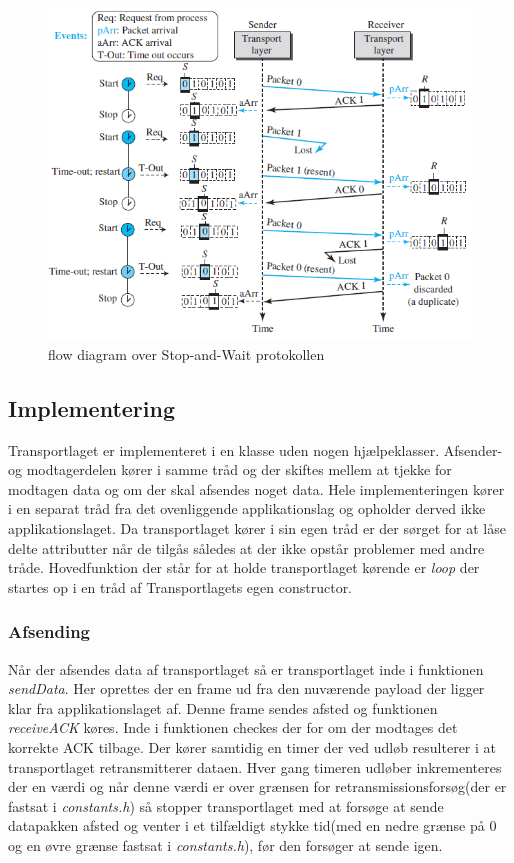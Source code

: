 \begin{figure}[h]
\centering
\includegraphics[scale=0.75]{Billeder/StopAndWaitFlow.png}
\caption{flow diagram over Stop-and-Wait protokollen
\label{StopAndWaitFlow}}
\end{figure}

\subsection{Implementering}
Transportlaget er implementeret i en klasse uden nogen hjælpeklasser. Afsender-og modtagerdelen kører i samme tråd og der skiftes mellem at tjekke for modtagen data og om der skal afsendes noget data. Hele implementeringen kører i en separat tråd fra det ovenliggende applikationslag og opholder derved ikke applikationslaget. Da transportlaget kører i sin egen tråd er der sørget for at låse delte attributter når de tilgås således at der ikke opstår problemer med andre tråde. Hovedfunktion der står for at holde transportlaget kørende er \textit{loop} der startes op i en tråd af Transportlagets egen constructor.

\subsubsection{Afsending}
Når der afsendes data af transportlaget så er transportlaget inde i funktionen \textit{sendData}. Her oprettes der en frame ud fra den nuværende payload der ligger klar fra applikationslaget af. Denne frame sendes afsted og funktionen \textit{receiveACK} køres. Inde i funktionen checkes der for om der modtages det korrekte ACK tilbage. Der kører samtidig en timer der ved udløb resulterer i at transportlaget retransmitterer dataen. Hver gang timeren udløber inkrementeres der en værdi og når denne værdi er over grænsen for retransmissionsforsøg(der er fastsat i \textit{constants.h}) så stopper transportlaget med at forsøge at sende datapakken afsted og venter i et tilfældigt stykke tid(med en nedre grænse på 0 og en øvre grænse fastsat i \textit{constants.h}), før den forsøger at sende igen.

